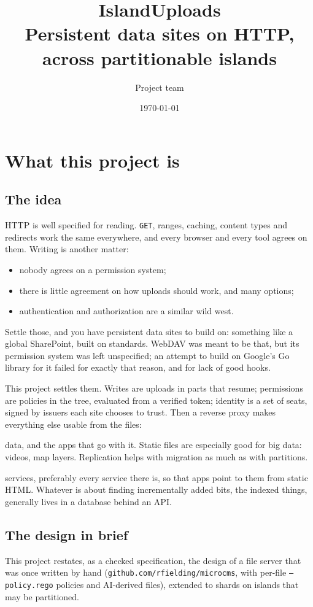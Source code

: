 \documentclass[11pt,oneside]{book}
\title{IslandUploads\\[1ex]\large Persistent data sites on HTTP, across partitionable islands}
\author{Project team}
\date{\today}
\providecommand{\tightlist}{\setlength{\itemsep}{0pt}\setlength{\parskip}{0pt}}
\begin{document}
\frontmatter
\maketitle
\tableofcontents
\mainmatter

\chapter{What this project is}
\section{The idea}
HTTP is well specified for reading. \texttt{GET}, ranges, caching, content types
and redirects work the same everywhere, and every browser and every tool agrees
on them. Writing is another matter:
\begin{itemize}\tightlist
\item nobody agrees on a permission system;
\item there is little agreement on how uploads should work, and many options;
\item authentication and authorization are a similar wild west.
\end{itemize}
Settle those, and you have persistent data sites to build on: something like a
global SharePoint, built on standards. WebDAV was meant to be that, but its
permission system was left unspecified; an attempt to build on Google's Go
library for it failed for exactly that reason, and for lack of good hooks.

This project settles them. Writes are uploads in parts that resume; permissions
are policies in the tree, evaluated from a verified token; identity is a set of
seats, signed by issuers each site chooses to trust. Then a reverse proxy makes
everything else usable from the files:
\begin{description}\tightlist
\item[\texttt{/files/}] data, and the apps that go with it. Static files are
  especially good for big data: videos, map layers. Replication helps with
  migration as much as with partitions.
\item[\texttt{/apis/}] services, preferably every service there is, so that apps
  point to them from static HTML. Whatever is about finding incrementally added
  bits, the indexed things, generally lives in a database behind an API.
\end{description}

\section{The design in brief}
This project restates, as a checked specification, the design of a file server
that was once written by hand (\texttt{github.com/rfielding/microcms}, with
per-file \texttt{--policy.rego} policies and AI-derived files), extended to
shards on islands that may be partitioned.
\end{document}
